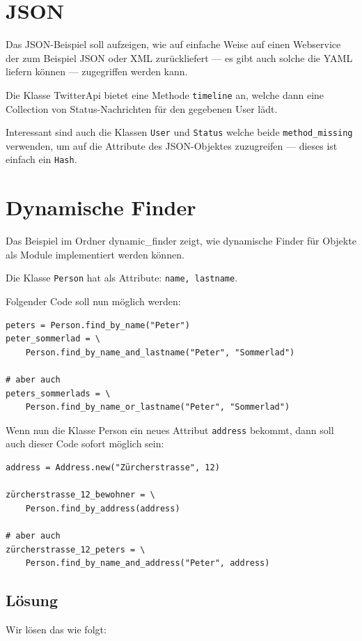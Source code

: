 \documentclass[a4book,11pt,twoside]{scrbook}
\begin{document}




\section{JSON} %
\label{sec:json}
Das JSON-Beispiel soll aufzeigen, wie auf einfache Weise auf einen Webservice der zum Beispiel JSON oder XML zurückliefert — es gibt auch solche die YAML liefern können — zugegriffen werden kann.

Die Klasse TwitterApi bietet eine Methode \texttt{timeline} an, welche dann eine Collection von Status-Nachrichten für den gegebenen User lädt.

Interessant sind auch die Klassen \texttt{User} und \texttt{Status} welche beide \texttt{method\_missing} verwenden, um auf die Attribute des JSON-Objektes zuzugreifen — dieses ist einfach ein \texttt{Hash}.



\section{Dynamische Finder} %
\label{sec:dynamische_finder}
Das Beispiel im Ordner dynamic\_finder zeigt, wie dynamische Finder für Objekte als Module implementiert werden können.

Die Klasse \texttt{Person} hat als Attribute: \texttt{name, lastname}.

Folgender Code soll nun möglich werden:
\begin{lstlisting}
peters = Person.find_by_name("Peter")
peter_sommerlad = \
	Person.find_by_name_and_lastname("Peter", "Sommerlad")

# aber auch
peters_sommerlads = \
	Person.find_by_name_or_lastname("Peter", "Sommerlad")
\end{lstlisting}

Wenn nun die Klasse Person ein neues Attribut \texttt{address} bekommt, dann soll auch dieser Code sofort möglich sein:
\begin{lstlisting}
address = Address.new("Zürcherstrasse", 12)

zürcherstrasse_12_bewohner = \
	Person.find_by_address(address)

# aber auch
zürcherstrasse_12_peters = \
	Person.find_by_name_and_address("Peter", address)
\end{lstlisting}

\subsection*{Lösung} %
\label{sub:lösung}
Wir lösen das wie folgt:
\end{document}
